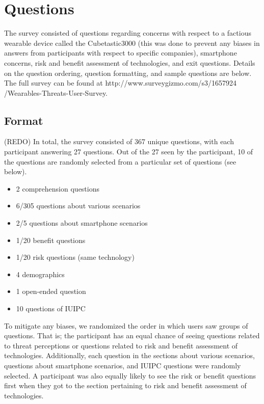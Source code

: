 \documentclass{acm_proc_article-sp}
\begin{document}
 
\section{Questions}
The survey consisted of questions regarding concerns with respect to a factious wearable device called the Cubetastic3000 (this was done to prevent any biases in answers from participants with respect to specific companies), smartphone concerns, risk and benefit assessment of technologies, and exit questions. Details on the question ordering, question formatting, and sample questions are below. The full survey can be found at http://www.surveygizmo.com/s3/1657924 /Wearables-Threats-User-Survey. 

\subsection{Format}
(REDO) In total, the survey consisted of 367 unique questions, with each participant answering 27 questions. Out of the 27 seen by the participant, 10 of the questions are randomly selected from a particular set of questions (see below).   \\[-.8cm]

\begin{itemize} \itemsep1pt \parskip0pt 
\item 2 comprehension questions 
\item 6/305 questions about various scenarios 
\item 2/5 questions about smartphone scenarios 
\item 1/20 benefit questions 
\item 1/20 risk questions (same technology) 
\item 4 demographics
\item 1 open-ended question 
\item 10 questions of IUIPC \\[-.8cm]
\end{itemize}

To mitigate any biases, we randomized the order in which users saw groups of questions. That is; the participant has an equal chance of seeing questions related to threat perceptions or questions related to risk and benefit assessment of technologies. Additionally, each question in the sections about various scenarios, questions about smartphone scenarios, and IUIPC questions were randomly selected. A participant was also equally likely to see the risk or benefit questions first when they got to the section pertaining to risk and benefit assessment of technologies. 
\end{document}
